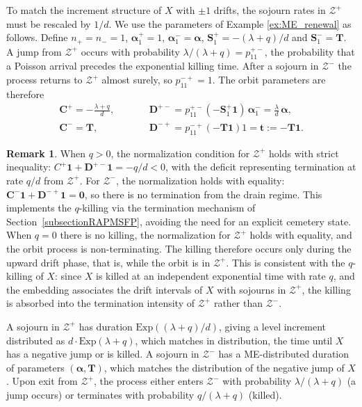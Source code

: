 \documentclass[a4paper,11pt]{article}
\numberwithin{equation}{section}
\theoremstyle{plain}
\theoremstyle{definition}
\newtheorem{remark}[theorem]{Remark}
\newcommand{\1}{\mathbf{1}}
\begin{document}
To match the increment structure of $X$ with $\pm 1$ drifts, the sojourn rates in $\mathcal{Z}^+$ must be rescaled by $1/d$.
We use the parameters of Example \ref{ex:ME_renewal} as follows. Define $n_+=n_-=1$, $\bm{\alpha}^+_1=1$, $\bm{\alpha}^-_1=\bm{\alpha}$, $\bm{S}^+_1=-(\lambda + q)/d$ and $\bm{S}^-_1=\bm{T}$. A jump from $\mathcal{Z}^+$ occurs with probability $\lambda/(\lambda+q)=p^{+-}_{11}$, the probability that a Poisson arrival precedes the exponential killing time. After a sojourn in $\mathcal{Z}^-$ the process returns to $\mathcal{Z}^+$ almost surely, so $p^{-+}_{11}=1$. 
The orbit parameters are therefore
\begin{equation}
\begin{split}\label{eq:params_bv_plus}
\bm{C}^+ = -\frac{\lambda + q}{d}, \qquad &\bm{D}^{+-}= p_{11}^{+-}(-\bm{S}_1^+\bm{1})\,\bm{\alpha}_1^-= \frac{\lambda}{d}\,\bm{\alpha},\\
\bm{C}^- = \bm{T},\qquad \ \ \qquad &\bm{D}^{-+} =p_{11}^{-+}(-\bm{T}\bm{1})1= \bm{t} := -\bm{T}\bm{1}.
\end{split}
\end{equation}


\begin{remark}
When $q>0$, the normalization condition for $\mathcal{Z}^+$ holds with strict inequality: $C^+\bm{1} + \bm{D}^{+-}\bm{1} = -q/d < 0$, with the deficit representing termination at rate $q/d$ from $\mathcal{Z}^+$. For $\mathcal{Z}^-$, the normalization holds with equality: $\bm{C}^-\bm{1} + \bm{D}^{-+}\bm{1} = \bm{0}$, so there is no termination from the drain regime. This implements the $q$-killing via the termination mechanism of Section~\ref{subsectionRAPMSFP}, avoiding the need for an explicit cemetery state. When $q=0$ there is no killing, the normalization for $\mathcal{Z}^+$ holds with equality, and the orbit process is non-terminating. The killing therefore occurs only during the upward drift phase, that is, while the orbit is in $\mathcal{Z}^+$. This is consistent with the $q$-killing of $X$: since $X$ is killed at an independent exponential time with rate $q$, and the embedding associates the drift intervals of $X$ with sojourns in $\mathcal{Z}^+$, the killing is absorbed into the termination intensity of $\mathcal{Z}^+$ rather than $\mathcal{Z}^-$.
\end{remark}

A sojourn in $\mathcal{Z}^+$ has duration $\mathrm{Exp}((\lambda+q)/d)$, giving a level increment distributed as $d \cdot \mathrm{Exp}(\lambda+q)$, which matches in distribution, the time until $X$ has a negative jump or is killed. A sojourn in $\mathcal{Z}^-$ has a ME-distributed duration of parameters $(\bm{\alpha}, \bm{T})$, which matches the distribution of the negative jump of $X$. Upon exit from $\mathcal{Z}^+$, the process either enters $\mathcal{Z}^-$ with probability $\lambda/(\lambda+q)$ (a jump occurs) or terminates with probability $q/(\lambda+q)$ (killed).
 
\end{document}

